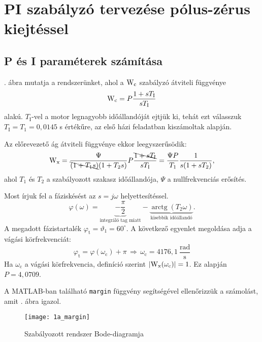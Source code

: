 \section{PI szabályzó tervezése pólus-zérus kiejtéssel}

\subsection{P és I paraméterek számítása}

. ábra mutatja a rendszerünket, ahol a $ \mathrm{W}_\text{c} $ szabályzó átviteli függvénye
\begin{equation}
	\mathrm{W}_\text{c} = P\frac{1+sT_\text{I}}{sT_\text{I}}
\end{equation}
alakú.
$T_\text{I}$-vel a motor legnagyobb időállandóját ejtjük ki, tehát ezt válasszuk $T_\text{I}=T_1=0,0145$ s értékűre,
az első házi feladatban kiszámoltak alapján.

Az előrevezető ág átviteli függvénye ekkor leegyszerűsödik:
\begin{equation}
	\mathrm{W}_\text{x} = \frac{\Psi}{\bcancel{(1+T_1s)}(1+T_2s)}P\frac{\bcancel{1+sT_\text{I} }}{sT_\text{I}}
	= \frac{\Psi P}{T_\text{1}}\frac{1}{s(1+sT_2)},
\end{equation}
ahol $T_1$ és $T_2$ a szabályozott szakasz időállandója, $\Psi$ a nullfrekvenciás erősítés.

Most írjuk fel a fáziskésést az $s=j\omega$ helyettesítéssel.
\begin{equation}
	\varphi(\omega) = \underbrace{-\frac{\pi}{2}}_\text{integráló tag miatt} - \underbrace{\operatorname{arctg}(T_2\omega)}_\text{kisebbik időállandó}.
\end{equation}
A megadott fázistartalék $\varphi_\text{t} = \vartheta_1=60^\circ$. A következő egyenlet megoldása adja a vágási
körfrekvenciát:
\begin{equation}
	\varphi_\text{t} = \varphi(\omega_\text{c}) +\pi \,\Rightarrow\, \omega_\text{c} = 4176,1~\frac{\text{rad}}{\text{s}}
\end{equation}
Ha $\omega_\text{c}$ a vágási körfrekvencia, definíció szerint $\left\lvert \mathrm{W}_\text{x}(\omega_\text{c}) \right\rvert = 1$.
Ez alapján $ P = 4,0709$.

A MATLAB-ban található \verb|margin| függvény segítségével ellenőrizzük a számolást, amit . ábra igazol.
\begin{figure}[H]
	\centering
	\texttt{[image: 1a\_margin]}
	\caption{Szabályozott rendszer Bode-diagramja}
	\label{fig:1a_margin}
\end{figure}

